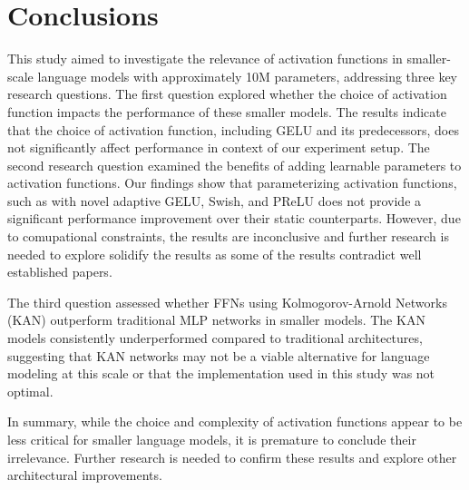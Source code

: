 \section{Conclusions} %
\label{sec:conclusion}
This study aimed to investigate the relevance of activation functions in smaller-scale language models with approximately 10M parameters, addressing three key research questions. The first question explored whether the choice of activation function impacts the performance of these smaller models. The results indicate that the choice of activation function, including GELU and its predecessors, does not significantly affect performance in context of our experiment setup. The second research question examined the benefits of adding learnable parameters to activation functions. Our findings show that parameterizing activation functions, such as with novel adaptive GELU, Swish, and PReLU does not provide a significant performance improvement over their static counterparts. However, due to comupational constraints, the results are inconclusive and further research is needed to explore solidify the results as some of the results contradict well established papers.
 
The third question assessed whether FFNs using Kolmogorov-Arnold Networks (KAN) outperform traditional MLP networks in smaller models. The KAN models consistently underperformed compared to traditional architectures, suggesting that KAN networks may not be a viable alternative for language modeling at this scale or that the implementation used in this study was not optimal.

In summary, while the choice and complexity of activation functions appear to be less critical for smaller language models, it is premature to conclude their irrelevance. Further research is needed to confirm these results and explore other architectural improvements.